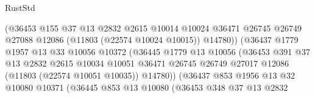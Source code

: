 \begin{lexlean}{RustStd}
\begin{coremodule}
                                    (@36453
                                      @155
                                      @37
                                      @13
                                      @2832
                                      @2615
                                      @10014
                                      @10024
                                      @36471
                                      @26745
                                      @26749
                                      @27088
                                      @12086
                                      (@11803 (@22574 @10024 @10015))
                                      @14780))
                                  (@36437
                                    @1779
                                    @1957
                                    @13
                                    @33
                                    @10056
                                    @10372
                                    (@36445
                                      @1779
                                      @13
                                      @10056
                                      (@36453
                                        @391
                                        @37
                                        @13
                                        @2832
                                        @2615
                                        @10034
                                        @10051
                                        @36471
                                        @26745
                                        @26749
                                        @27017
                                        @12086
                                        (@11803 (@22574 @10051 @10035))
                                        @14780))
                                    (@36437
                                      @853
                                      @1956
                                      @13
                                      @32
                                      @10080
                                      @10371
                                      (@36445
                                        @853
                                        @13
                                        @10080
                                        (@36453
                                          @348
                                          @37
                                          @13
                                          @2832

\end{coremodule}
\end{lexlean}
